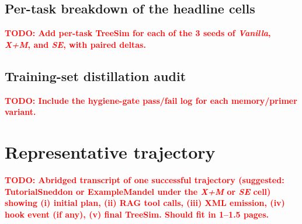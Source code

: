 \documentclass{article}
\newcommand{\todo}[1]{\textcolor{red}{\textbf{TODO: #1}}}
\begin{document}
\subsection{Per-task breakdown of the headline cells}
\todo{Add per-task TreeSim for each of the 3 seeds of \emph{Vanilla}, \emph{X+M}, and \emph{SE}, with paired deltas.}

\subsection{Training-set distillation audit}
\todo{Include the hygiene-gate pass/fail log for each memory/primer variant.}


\section{Representative trajectory}
\label{app:case-study}

\todo{Abridged transcript of one successful trajectory (suggested: TutorialSneddon or ExampleMandel under the \emph{X+M} or \emph{SE} cell) showing (i) initial plan, (ii) RAG tool calls, (iii) XML emission, (iv) hook event (if any), (v) final TreeSim. Should fit in 1--1.5 pages.}



\newpage

\end{document}
